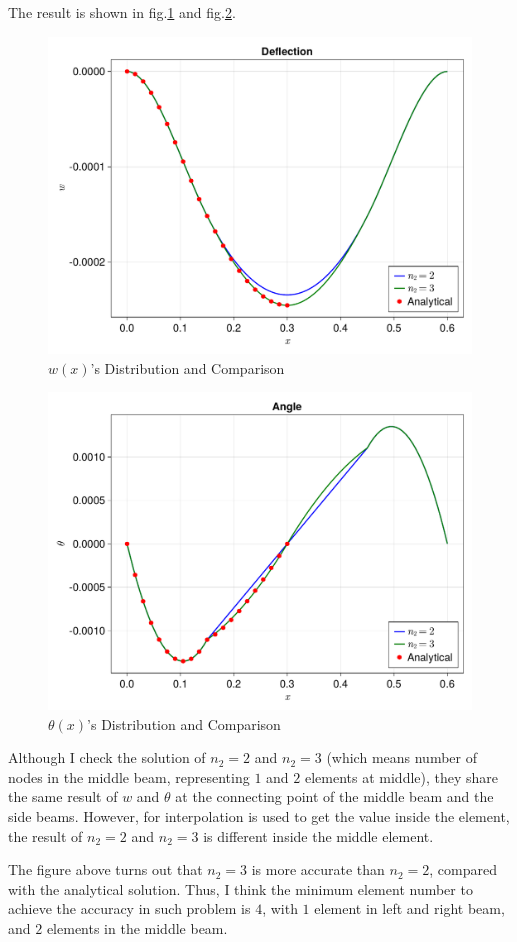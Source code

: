 The result is shown in fig.\ref{fig:problem2_w} and fig.\ref{fig:problem2_theta}.

\begin{figure}[H]
    \centering
    \includegraphics[width=\linewidth]{../problem2/images/deflection.pdf}
    \caption{$w(x)$'s Distribution and Comparison}
    \label{fig:problem2_w}
\end{figure}

\begin{figure}[H]
    \centering
    \includegraphics[width=\linewidth]{../problem2/images/angle.pdf}
    \caption{$\theta(x)$'s Distribution and Comparison}
    \label{fig:problem2_theta}
\end{figure}

Although I check the solution of $n_2=2$ and
$n_2=3$ (which means number of nodes in the middle beam,
representing $1$ and $2$ elements at middle),
they share the same result of $w$ and $\theta$ 
at the connecting point of the middle beam and the side beams.
However,
for interpolation is used to get the value inside the element,
the result of $n_2=2$ and $n_2=3$ is different inside the middle element.

The figure above turns out that $n_2=3$ is more accurate than $n_2=2$, 
compared with the analytical solution.
Thus, I think the minimum element number to achieve the accuracy in 
such problem is $4$,
with $1$ element in left and right beam,
and $2$ elements in the middle beam.